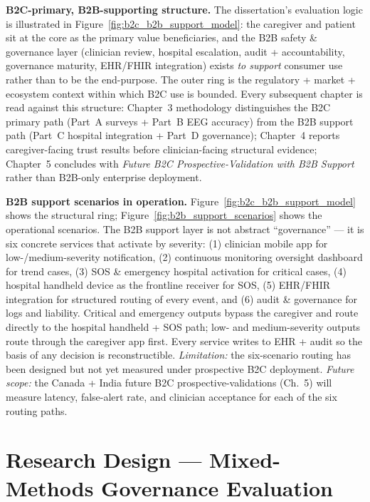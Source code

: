 \noindent\textbf{B2C-primary, B2B-supporting structure.} The dissertation's evaluation logic is illustrated in Figure~\ref{fig:b2c_b2b_support_model}: the caregiver and patient sit at the core as the primary value beneficiaries, and the B2B safety \& governance layer (clinician review, hospital escalation, audit + accountability, governance maturity, EHR/FHIR integration) exists \emph{to support} consumer use rather than to be the end-purpose. The outer ring is the regulatory + market + ecosystem context within which B2C use is bounded. Every subsequent chapter is read against this structure: Chapter~3 methodology distinguishes the B2C primary path (Part~A surveys + Part~B EEG accuracy) from the B2B support path (Part~C hospital integration + Part~D governance); Chapter~4 reports caregiver-facing trust results before clinician-facing structural evidence; Chapter~5 concludes with \emph{Future B2C Prospective-Validation with B2B Support} rather than B2B-only enterprise deployment.



\noindent\textbf{B2B support scenarios in operation.} Figure~\ref{fig:b2c_b2b_support_model} shows the structural ring; Figure~\ref{fig:b2b_support_scenarios} shows the operational scenarios. The B2B support layer is not abstract ``governance'' --- it is six concrete services that activate by severity: (1) clinician mobile app for low-/medium-severity notification, (2) continuous monitoring oversight dashboard for trend cases, (3) SOS \& emergency hospital activation for critical cases, (4) hospital handheld device as the frontline receiver for SOS, (5) EHR/FHIR integration for structured routing of every event, and (6) audit \& governance for logs and liability. Critical and emergency outputs bypass the caregiver and route directly to the hospital handheld + SOS path; low- and medium-severity outputs route through the caregiver app first. Every service writes to EHR + audit so the basis of any decision is reconstructible. \emph{Limitation:} the six-scenario routing has been designed but not yet measured under prospective B2C deployment. \emph{Future scope:} the Canada + India future B2C prospective-validations (Ch.~5) will measure latency, false-alert rate, and clinician acceptance for each of the six routing paths.




\section{Research Design --- Mixed-Methods Governance Evaluation}
\label{sec:research_design_overview}

